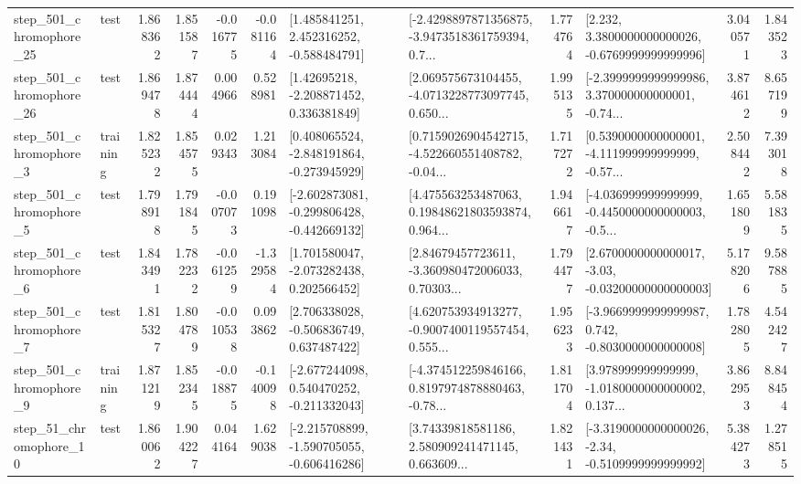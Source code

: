 \begin{tabular}{llrrrrllrlrr}
  step\_501\_chromophore\_25 &      test &      1.868362 &    1.851587 &     -0.016775 & -0.081164 &    [1.485841251, 2.452316252, -0.588484791] &  [-2.4298897871356875, -3.9473518361759394, 0.7... &       1.774764 &   [2.232, 3.3800000000000026, -0.6769999999999996] &            3.040571 &          1.843523 \\
  step\_501\_chromophore\_26 &      test &      1.869478 &    1.874444 &      0.004966 &  0.528981 &     [1.42695218, -2.208871452, 0.336381849] &  [2.069575673104455, -4.0713228773097745, 0.650... &       1.995135 &  [-2.3999999999999986, 3.370000000000001, -0.74... &            3.874612 &          8.657199 \\
   step\_501\_chromophore\_3 &  training &      1.825232 &    1.854575 &      0.029343 &  1.213084 &   [0.408065524, -2.848191864, -0.273945929] &  [0.7159026904542715, -4.522660551408782, -0.04... &       1.717272 &  [0.5390000000000001, -4.111999999999999, -0.57... &            2.508442 &          7.393018 \\
   step\_501\_chromophore\_5 &      test &      1.798918 &    1.791845 &     -0.007073 &  0.191098 &  [-2.602873081, -0.299806428, -0.442669132] &  [4.475563253487063, 0.19848621803593874, 0.964... &       1.946617 &  [-4.036999999999999, -0.4450000000000003, -0.5... &            1.651809 &          5.581835 \\
   step\_501\_chromophore\_6 &      test &      1.843491 &    1.782232 &     -0.061259 & -1.329584 &    [1.701580047, -2.073282438, 0.202566452] &  [2.84679457723611, -3.360980472006033, 0.70303... &       1.794477 &  [2.6700000000000017, -3.03, -0.03200000000000003] &            5.178206 &          9.587885 \\
   step\_501\_chromophore\_7 &      test &      1.815327 &    1.804789 &     -0.010538 &  0.093862 &    [2.706338028, -0.506836749, 0.637487422] &  [4.620753934913277, -0.9007400119557454, 0.555... &       1.956233 &  [-3.9669999999999987, 0.742, -0.8030000000000008] &            1.782805 &          4.542427 \\
   step\_501\_chromophore\_9 &  training &      1.871219 &    1.852345 &     -0.018875 & -0.140098 &   [-2.677244098, 0.540470252, -0.211332043] &  [-4.374512259846166, 0.8197974878880463, -0.78... &       1.811704 &  [3.978999999999999, -1.0180000000000002, 0.137... &            3.862953 &          8.848454 \\
   step\_51\_chromophore\_10 &      test &      1.860062 &    1.904227 &      0.044164 &  1.629038 &  [-2.215708899, -1.590705055, -0.606416286] &  [3.74339818581186, 2.580909241471145, 0.663609... &       1.821431 &  [-3.3190000000000026, -2.34, -0.5109999999999992] &            5.384273 &          1.278515 \\

\end{tabular}
